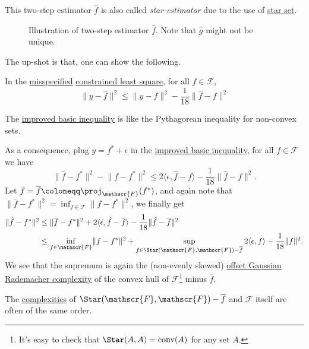 This two-step estimator \(\hat{f} \) is also called \emph{star-estimator} due to the use of \hyperref[def:star-set]{star set}.

\begin{figure}[H]
	\centering
	\caption{Illustration of two-step estimator \(\hat{f} \). Note that \(\hat{g} \) might not be unique.}
	\label{fig:star-estimator}
\end{figure}

The up-shot is that, one can show the following.

\begin{lemma}\label{lma:improved-basic-inequality}
	In the \hyperref[def:misspecified]{misspecified} \hyperref[prb:constrained-LS]{constrained least square}, for all \(f\in \mathscr{F} \),
	\[
		\lVert y - \hat{f}  \rVert ^2 \leq \lVert y - f \rVert ^2 - \frac{1}{18} \lVert \hat{f} - f \rVert ^2
	\]
\end{lemma}

\begin{remark}
	The \hyperref[lma:improved-basic-inequality]{improved basic inequality} is like the Pythagorean inequality for non-convex sets.
\end{remark}

As a consequence, plug \(y = f^{\ast} + \epsilon \) in the \hyperref[lma:improved-basic-inequality]{improved basic inequality}, for all \(f\in \mathscr{F} \) we have
\[
	\lVert \hat{f} - f^{\ast}  \rVert ^2 - \lVert f - f^{\ast}  \rVert ^2
	\leq 2 \langle \epsilon , \hat{f} - f \rangle - \frac{1}{18} \lVert \hat{f} - f \rVert ^2.
\]
Let \(f = \overline{f} \coloneqq \proj_{\mathscr{F} }(f^{\ast} ) \), and again note that \(\lVert \overline{f} - f^{\ast} \rVert ^2 = \inf _{f\in \mathscr{F} } \lVert f - f^{\ast} \rVert ^2\), we finally get
\[
	\begin{split}
		\lVert \hat{f} - f^{\ast} \rVert ^2
		 & \leq \lVert \overline{f} - f^{\ast} \rVert ^2 +  2 \langle \epsilon , \hat{f} - \overline{f} \rangle - \frac{1}{18} \lVert \hat{f} - \overline{f} \rVert ^2                                      \\
		 & \leq \inf _{f\in \mathscr{F} } \lVert f - f^{\ast} \rVert ^2 + \sup _{f\in \Star(\mathscr{F} , \mathscr{F} ) - \overline{f}  } 2 \langle \epsilon , f \rangle - \frac{1}{18} \lVert f \rVert ^2.
	\end{split}
\]
We see that the supremum is again the (non-evenly skewed) \hyperref[def:offset-Gaussian-Rademacher-complexity]{offset Gaussian Rademacher complexity} of the convex hull of \(\mathscr{F} \)\footnote{It's easy to check that \(\Star(A, A) = \operatorname{conv}(A) \) for any set \(A\).} minus \(\overline{f} \).

\begin{remark}
	The \hyperref[def:offset-Gaussian-Rademacher-complexity]{complexities} of \(\Star(\mathscr{F} , \mathscr{F} ) - \overline{f} \) and \(\mathscr{F} \) itself are often of the same order.
\end{remark}